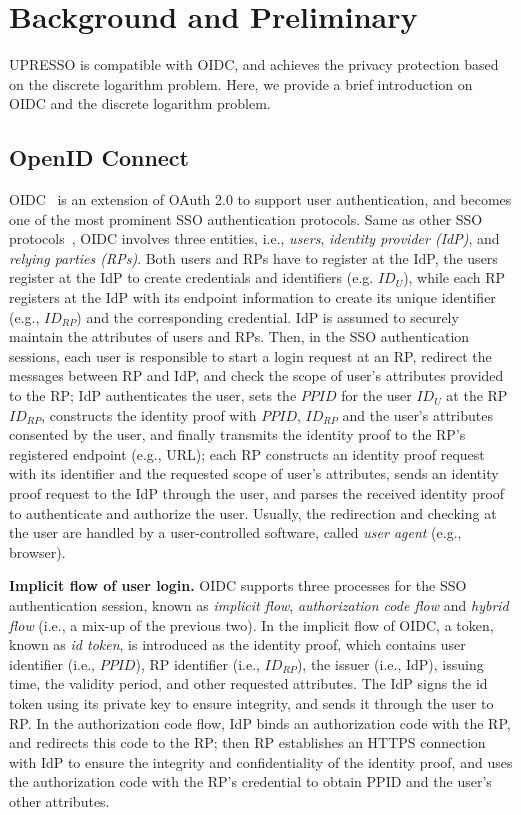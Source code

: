 \section{Background and Preliminary}
\label{sec:background}
UPRESSO is compatible with OIDC, and achieves the privacy protection based on the discrete logarithm problem.
Here, we provide a brief introduction on OIDC and the discrete logarithm problem.

\subsection{OpenID Connect}
\label{subsec:OIDC}
OIDC~\cite{OpenIDConnect} is an extension of OAuth 2.0 to support user authentication,
 and becomes one of the most prominent SSO authentication protocols.
Same as other SSO protocols~\cite{SAMLIdentifier}, OIDC involves three entities, i.e., {\em users}, {\em identity provider (IdP)}, and {\em relying parties (RPs)}.
Both users and RPs have to register at the IdP,    
the users register at the IdP to create credentials and identifiers (e.g. $ID_U$),
while each RP registers at the IdP with its endpoint information to create its unique identifier (e.g., $ID_{RP}$) and the corresponding credential.
IdP is assumed to securely maintain the attributes  of users and RPs.   
Then, in the SSO authentication sessions, 
 each user is responsible to start a login request at an RP, redirect the messages between RP and IdP, and check the scope of user's attributes provided to the RP;
 IdP authenticates the user, sets the $PPID$ for the user $ID_U$ at the RP $ID_{RP}$,
 constructs the identity proof with  $PPID$, $ID_{RP}$ and the user's attributes consented by the user, and finally transmits the identity proof to the RP's registered endpoint (e.g., URL);
 each RP constructs an identity proof request with its identifier and the requested scope of  user's attributes, sends an identity proof request to the IdP through the user, and parses the received identity proof to authenticate and authorize the user.
Usually, the redirection and checking at the user are handled by a user-controlled software, called {\em user agent} (e.g., browser).



\noindent\textbf{Implicit flow of user login.}
OIDC supports three processes for the SSO authentication session, known as {\em implicit flow}, {\em authorization code flow} and {\em hybrid flow} (i.e., a mix-up of the previous two).
In the implicit flow of OIDC, a token, known as {\em id token}, is introduced as the identity proof, which contains user identifier (i.e., $PPID$), RP identifier (i.e., $ID_{RP}$), the issuer (i.e., IdP), issuing time, the validity period, and other requested attributes. The IdP signs the id token using its private key to ensure integrity, and sends it through the user to RP.
In the authorization code flow, IdP binds an authorization code with the RP, and redirects this code to the RP;
 then RP establishes an HTTPS connection with IdP to ensure the integrity and confidentiality of the identity proof, and  uses the authorization code with the RP's credential to obtain PPID and the user's other  attributes.

